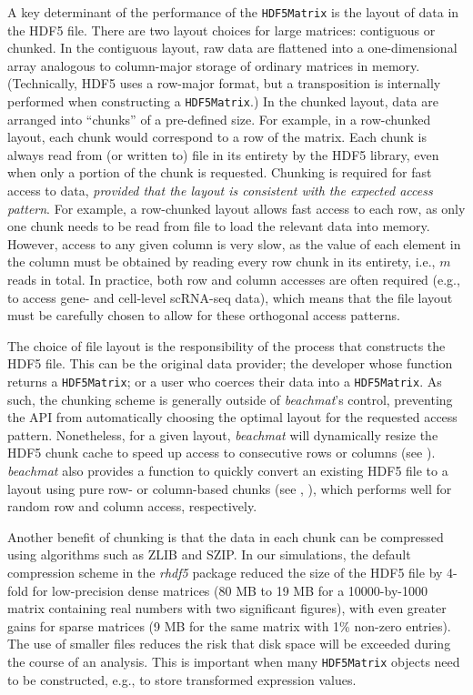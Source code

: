\documentclass{article}
\newcommand{\beachmat}{\textit{beachmat}}
\newcommand{\code}[1]{\texttt{#1}}
\begin{document}
A key determinant of the performance of the \code{HDF5Matrix} is the layout of data in the HDF5 file.
There are two layout choices for large matrices: contiguous or chunked.
In the contiguous layout, raw data are flattened into a one-dimensional array analogous to column-major storage of ordinary matrices in memory.
(Technically, HDF5 uses a row-major format, but a transposition is internally performed when constructing a \code{HDF5Matrix}.)
In the chunked layout, data are arranged into ``chunks'' of a pre-defined size.
For example, in a row-chunked layout, each chunk would correspond to a row of the matrix.
Each chunk is always read from (or written to) file in its entirety by the HDF5 library, even when only a portion of the chunk is requested.
Chunking is required for fast access to data, \textit{provided that the layout is consistent with the expected access pattern}.
For example, a row-chunked layout allows fast access to each row, as only one chunk needs to be read from file to load the relevant data into memory.
However, access to any given column is very slow, as the value of each element in the column must be obtained by reading every row chunk in its entirety, i.e., $m$ reads in total.
In practice, both row and column accesses are often required (e.g., to access gene- and cell-level scRNA-seq data), which means that the file layout must be carefully chosen to allow for these orthogonal access patterns.

The choice of file layout is the responsibility of the process that constructs the HDF5 file.
This can be the original data provider; the developer whose function returns a \code{HDF5Matrix}; or a user who coerces their data into a \code{HDF5Matrix}.
As such, the chunking scheme is generally outside of \beachmat{}'s control, preventing the API from automatically choosing the optimal layout for the requested access pattern.
Nonetheless, for a given layout, \beachmat{} will dynamically resize the HDF5 chunk cache to speed up access to consecutive rows or columns (see \suppseclayoutoptim{}).
\beachmat{} also provides a function to quickly convert an existing HDF5 file to a layout using pure row- or column-based chunks (see \suppseclayoutrandom{}, \suppfighdfrandom{}), which performs well for random row and column access, respectively.

Another benefit of chunking is that the data in each chunk can be compressed using algorithms such as ZLIB and SZIP.
In our simulations, the default compression scheme in the \textit{rhdf5} package reduced the size of the HDF5 file by 4-fold for low-precision dense matrices (80 MB to 19 MB for a 10000-by-1000 matrix containing real numbers with two significant figures), with even greater gains for sparse matrices (9 MB for the same matrix with 1\% non-zero entries).
The use of smaller files reduces the risk that disk space will be exceeded during the course of an analysis.
This is important when many \code{HDF5Matrix} objects need to be constructed, e.g., to store transformed expression values.
\end{document}
